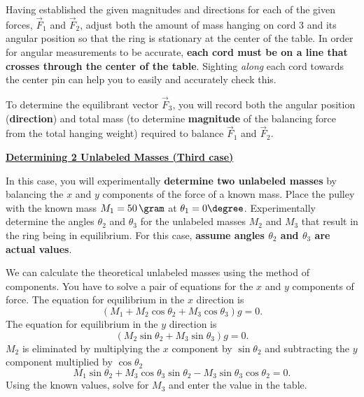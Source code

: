 Having established the given magnitudes and directions for each of the given forces, $\vec{F}_{1}$ and $\vec{F}_{2}$, adjust both the amount of mass hanging on cord 3 and its angular position so that the ring is stationary at the center of the table.  In order for angular measurements to be accurate, \textbf{each cord must be on a line that crosses through the center of the table}.  Sighting \textit{along} each cord towards the center pin can help you to easily and accurately check this.

To determine the equilibrant vector $\vec{F}_{3}$, you will record both the angular position (\textbf{direction}) and total mass (to determine \textbf{magnitude} of the balancing force from the total hanging weight) required to balance $\vec{F}_{1}$ and $\vec{F}_{2}$.


\underline{\textbf{Determining 2 Unlabeled Masses (Third case)}}


In this case, you will experimentally \textbf{determine two unlabeled masses} by balancing the $x$ and $y$ components of the force of a known mass.
Place the pulley with the known mass $M_1 = 50\,\gram $ at $\theta_1 = 0\degree$.
Experimentally determine the angles $\theta_2$ and $\theta_3$ for the unlabeled masses $M_2$ and $M_3$ that result in the ring being in equilibrium. For this case, \textbf{assume angles $\theta_2$ and $\theta_3$ are actual values}.


We can calculate the theoretical unlabeled masses using the method of components.
You have to solve a pair of equations for the $x$ and $y$ components of force.
The equation for equilibrium in the $x$ direction is
\begin{equation}
  \label{eq:M01unknownx}
  (M_1 + M_2 \cos\theta_2 + M_3 \cos\theta_3)g = 0.
\end{equation}
The equation for equilibrium in the $y$ direction is
\begin{equation}
  \label{eq:M01unknowny}
  (M_2 \sin\theta_2 + M_3 \sin\theta_3)g = 0.
\end{equation}
$M_2$ is eliminated by multiplying the $x$ component by $\sin \theta_2$ and subtracting the $y$ component multiplied by $\cos \theta_2$
\begin{equation}
  \label{eq:M01solveM3}
  M_1 \sin \theta_2  + M_3 \cos \theta_3 \sin \theta_2 - M_3 \sin \theta_3 \cos \theta_2 = 0.
\end{equation}
Using the known values, solve for $M_3$ and enter the value in the table.

